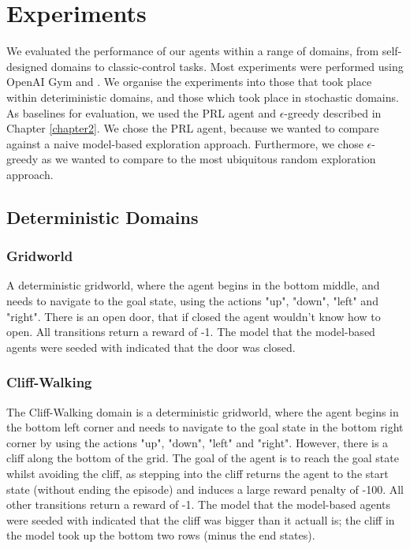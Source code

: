 \chapter{Experiments}
\label{chapter5}
We evaluated the performance of our agents within a range of domains, from self-designed domains to classic-control tasks. Most experiments were performed using OpenAI Gym \cite{1606.01540} and \cite{osband2020bsuite}. We organise the experiments into those that took place within deteriministic domains, and those which took place in stochastic domains. As baselines for evaluation, we used the PRL agent and $\epsilon$-greedy described in Chapter \ref{chapter2}. We chose the PRL agent, because we wanted to compare against a naive model-based exploration approach. Furthermore, we chose $\epsilon$-greedy as we wanted to compare to the most ubiquitous random exploration approach.
\section{Deterministic Domains}
\subsection{Gridworld}
A deterministic gridworld, where the agent begins in the bottom middle, and needs to navigate to the goal state, using the actions "up", "down", "left" and "right". There is an open door, that if closed the agent wouldn't know how to open. All transitions return a reward of -1. The model that the model-based agents were seeded with indicated that the door was closed.

\subsection{Cliff-Walking}
The Cliff-Walking domain \cite{Sutton1998} is a deterministic gridworld, where the agent begins in the bottom left corner and needs to navigate to the goal state in the bottom right corner by using the actions "up", "down", "left" and "right". However, there is a cliff along the bottom of the grid. The goal of the agent is to reach the goal state whilst avoiding the cliff, as stepping into the cliff returns the agent to the start state (without ending the episode) and induces a large reward penalty of -100. All other transitions return a reward of -1. The model that the model-based agents were seeded with indicated that the cliff was bigger than it actuall is; the cliff in the model took up the bottom two rows (minus the end states).

